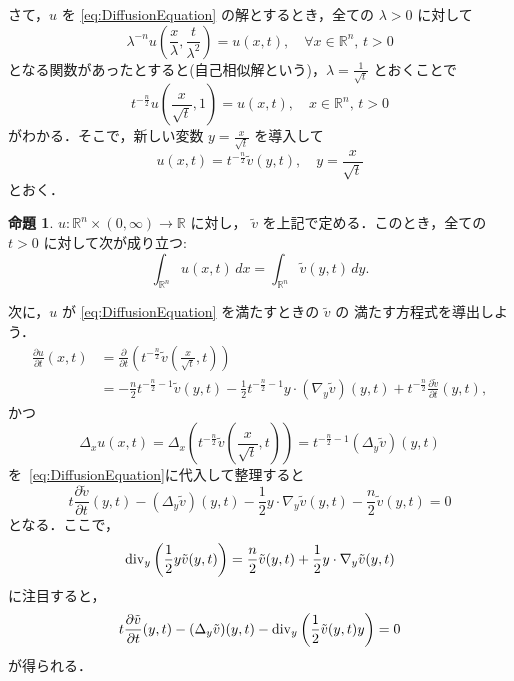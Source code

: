 \documentclass[paper=a4,
fontsize=12pt,
reqno,
uplatex,
dvipdfmx]{jlreq}
\theoremstyle{definition} %
\newtheorem{proposition}[theorem]{命題}
\begin{document}
さて，$u$ を \eqref{eq:DiffusionEquation} の解とするとき，全ての
$\lambda > 0$ に対して
\begin{equation}
 \lambda^{-n}
  u
  \left(
   \frac{x}{\lambda}, 
   \frac{t}{\lambda^2}
  \right)
  =
  u(x, t), \quad \forall x \in \mathbb{R}^n, \, t > 0
\end{equation}
となる関数があったとすると(自己相似解という)，$\lambda =
\frac{1}{\sqrt{t}}$ とおくことで
\begin{equation}
 t^{-\frac{n}{2}} u\left(\frac{x}{\sqrt{t}}, 1\right) = u(x, t), \quad x \in \mathbb{R}^n, \, t > 0
\end{equation}
がわかる．そこで，新しい変数 $y = \frac{x}{\sqrt{t}}$ を導入して
\begin{equation}
 u(x, t)
  =
  t^{-\frac{n}{2}}
  \tilde{v}(y, t),
  \quad
  y = \frac{x}{\sqrt{t}}
\end{equation}
とおく．

\begin{proposition}
 $u: \mathbb{R}^n \times (0, \infty) \rightarrow \mathbb{R}$
 に対し，
 $\tilde{v}$ を上記で定める．このとき，全ての $t > 0$ に対して次が成り立つ:
 \begin{equation}
  \int_{\mathbb{R}^n} u(x, t) \, dx 
   =
   \int_{\mathbb{R}^n} \tilde{v}(y, t) \, dy.
 \end{equation}
\end{proposition}

次に，$u$ が \eqref{eq:DiffusionEquation} を満たすときの $\tilde{v}$ の
満たす方程式を導出しよう．
\begin{align}
 \frac{\partial u}{\partial t}(x, t)
 &=
 \frac{\partial}{\partial t}
 \left(
 t^{-\frac{n}{2}} \tilde{v}\left(\frac{x}{\sqrt{t}}, t\right) \right) \tag{592} \\
 &= -\frac{n}{2} t^{-\frac{n}{2}-1} \tilde{v}(y, t) - \frac{1}{2} t^{-\frac{n}{2}-1} y \cdot (\nabla_y \tilde{v})(y, t) + t^{-\frac{n}{2}} \frac{\partial \tilde{v}}{\partial t}(y, t),
\end{align}
かつ
\begin{equation}
 \Delta_x u(x, t)
  = 
  \Delta_x
  \left(
   t^{-\frac{n}{2}}
   \tilde{v}\left(\frac{x}{\sqrt{t}}, t\right) 
  \right)
  =
  t^{-\frac{n}{2}-1} 
  (\Delta_y \tilde{v})(y, t)
\end{equation}
を~\eqref{eq:DiffusionEquation}に代入して整理すると
\begin{equation}
 t \frac{\partial \tilde{v}}{\partial t}(y, t)
  -
  (\Delta_y \tilde{v})(y, t)
  -
  \frac{1}{2} y \cdot \nabla_y \tilde{v}(y, t)
  -
  \frac{n}{2} \tilde{v}(y, t) = 0 
\end{equation}
となる．ここで，
\begin{equation}
 \operatorname{div}_y
  \left(
   \frac{1}{2}
   y
   \tilde{v}(y, t)
  \right)
  =
  \frac{n}{2}
  \tilde{v}(y, t)
  + 
  \frac{1}{2}
  y
  \cdot
  \nabla_y
  \tilde{v}(y, t)
\end{equation}
に注目すると，
\begin{equation}
 t \frac{\partial \tilde{v}}{\partial t}(y, t)
  -
  (\Delta_y \tilde{v})(y, t)
  -
  \operatorname{div}_y 
  \left(
   \frac{1}{2}
   \tilde{v}(y, t)
   y
  \right)
  = 0
\end{equation}
が得られる．
\end{document}
